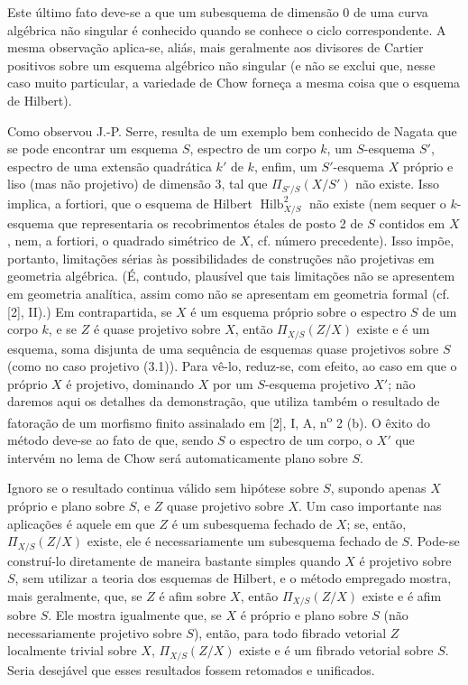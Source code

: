 Este último fato deve-se a que um subesquema de dimensão 0 de uma curva
algébrica não singular é conhecido quando se conhece o ciclo correspondente.
A mesma observação aplica-se, aliás, mais geralmente aos divisores de Cartier
positivos sobre um esquema algébrico não singular (e não se exclui que, nesse
caso muito particular, a variedade de Chow forneça a mesma coisa que o esquema
de Hilbert).


Como observou J.-P. Serre, resulta de um exemplo bem conhecido de Nagata que se
pode encontrar um esquema $S$, espectro de um corpo $k$, um $S$-esquema $S'$,
espectro de uma extensão quadrática $k'$ de $k$, enfim, um $S'$-esquema $X$
próprio e liso (mas não projetivo) de dimensão 3, tal que
$\Pi_{S'/S}(X/S')$ não existe. Isso implica, a fortiori, que o esquema de
Hilbert $\operatorname{Hilb}^2_{X/S}$ não existe (nem sequer o $k$-esquema que
representaria os recobrimentos étales de posto 2 de $S$ contidos em $X$, nem,
a fortiori, o quadrado simétrico de $X$, cf. número precedente). Isso impõe,
portanto, limitações sérias às possibilidades de construções não projetivas em
geometria algébrica. (É, contudo, plausível que tais limitações não se
apresentem em geometria analítica, assim como não se apresentam em geometria
formal (cf. [2], II).) Em contrapartida, se $X$ é um esquema próprio sobre o
espectro $S$ de um corpo $k$, e se $Z$ é quase projetivo sobre $X$, então
$\Pi_{X/S}(Z/X)$ existe e é um esquema, soma disjunta de uma sequência de
esquemas quase projetivos sobre $S$ (como no caso projetivo (3.1)). Para vê-lo,
reduz-se, com efeito, ao caso em que o próprio $X$ é projetivo, dominando $X$
por um $S$-esquema projetivo $X'$; não daremos aqui os detalhes da demonstração,
que utiliza também o resultado de fatoração de um morfismo finito assinalado em
[2], I, A, n\textsuperscript{o} 2 (b). O êxito do método deve-se ao fato de que,
sendo $S$ o espectro de um corpo, o $X'$ que intervém no lema de Chow será
automaticamente plano sobre $S$.

Ignoro se o resultado continua válido sem hipótese sobre $S$, supondo apenas
$X$ próprio e plano sobre $S$, e $Z$ quase projetivo sobre $X$. Um caso
importante nas aplicações é aquele em que $Z$ é um subesquema fechado de $X$;
se, então, $\Pi_{X/S}(Z/X)$ existe, ele é necessariamente um subesquema fechado
de $S$. Pode-se
construí-lo diretamente de maneira bastante simples quando $X$ é projetivo
sobre $S$, sem utilizar a teoria dos esquemas de Hilbert, e o método empregado
mostra, mais geralmente, que, se $Z$ é afim sobre $X$, então
$\Pi_{X/S}(Z/X)$ existe e é afim sobre $S$. Ele mostra igualmente que, se $X$
é próprio e plano sobre $S$ (não necessariamente projetivo sobre $S$), então,
para todo fibrado vetorial $Z$ localmente trivial sobre $X$,
$\Pi_{X/S}(Z/X)$ existe e é um fibrado vetorial sobre $S$. Seria desejável que
esses resultados fossem retomados e unificados.

